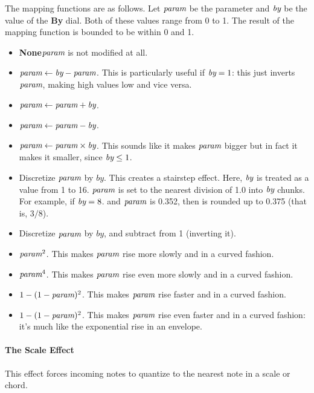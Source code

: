 \documentclass[twoside,10pt]{article}
\begin{document}
\newcommand\param{{\text{\it param}}}
\newcommand\by{{\text{\it by}}}

The mapping functions are as follows.  Let \(\param\) be the parameter and \(\by\) be the value of the {\bf By} dial.  Both of these values range from 0 to 1.  The result of the mapping function is bounded to be within 0 and 1.

\begin{itemize}
\item {\bf None}\qquad \(\param\) is not modified at all.
\item \(\param \leftarrow \by - \param\).  This is particularly useful if \(\by = 1\): this just inverts \(\param\), making high values low and vice versa.
\item \(\param \leftarrow \param + \by\).
\item  \(\param \leftarrow \param - \by\).
\item \(\param \leftarrow \param \times \by\).  This sounds like it makes \(\param\) bigger but in fact it makes it smaller, since \(\by \leq 1\).
\item Discretize \(\param\) by \(by\).  This creates a stairstep effect.  Here, \(\by\) is treated as a value from 1 to 16.   \(\param\) is set to the nearest division of 1.0 into \(\by\) chunks.  For example, if \(\by = 8\). and \(\param\) is 0.352, then \param is rounded up to 0.375 (that is, \(3/8\)).  
\item Discretize \(\param\) by \(by\), and subtract from 1 (inverting it).
\item \(\param^2\).  This makes \(\param\) rise more slowly and in a curved fashion.
\item \(\param^4\).  This makes \(\param\) rise even more slowly and in a curved fashion.
\item \(1-(1-\param)^2\).  This makes \(\param\) rise faster and in a curved fashion.
\item \(1-(1-\param)^2\).  This makes \(\param\) rise even faster and in a curved fashion: it's much like the exponential rise in an envelope.
\end{itemize}

\paragraph{The Scale Effect}

This effect forces incoming notes to quantize to the nearest note in a scale or chord.
\end{document}
